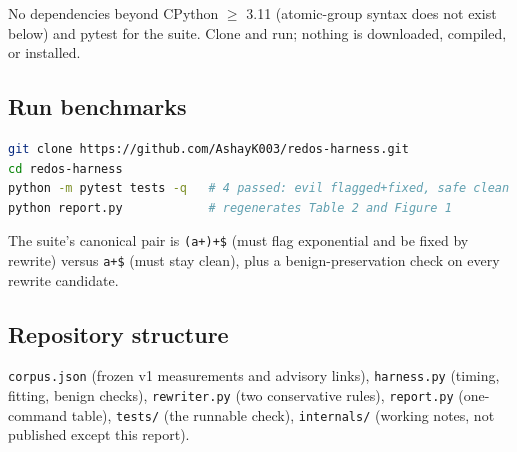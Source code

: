 \documentclass[11pt,a4paper]{article}
\begin{document}
No dependencies beyond CPython $\ge$ 3.11 (atomic-group syntax does not exist below) and pytest for the suite. Clone and run; nothing is downloaded, compiled, or installed.

\subsection{Run benchmarks}

\begin{lstlisting}[language=bash]
git clone https://github.com/AshayK003/redos-harness.git
cd redos-harness
python -m pytest tests -q   # 4 passed: evil flagged+fixed, safe clean
python report.py            # regenerates Table 2 and Figure 1
\end{lstlisting}

The suite's canonical pair is \verb!(a+)+$! (must flag exponential and be fixed by rewrite) versus \verb!a+$! (must stay clean), plus a benign-preservation check on every rewrite candidate.

\subsection{Repository structure}

\verb!corpus.json! (frozen v1 measurements and advisory links), \verb!harness.py! (timing, fitting, benign checks), \verb!rewriter.py! (two conservative rules), \verb!report.py! (one-command table), \verb!tests/! (the runnable check), \verb!internals/! (working notes, not published except this report).
\end{document}
